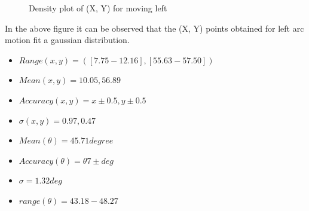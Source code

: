 \documentclass[11pt,a4paper,titlepage]{article}
\begin{document}
\begin{itemize}
\begin{figure}[H]
		\label{fig:sub1}
	\caption{\color{blue}Density plot of (X, Y) for moving left}
  \end{figure}
  In the above figure it can be observed that the (X, Y) points obtained for left arc motion fit a gaussian distribution.
\begin{itemize}
\item $ Range (x,y) =([7.75-12.16],[55.63-57.50])  $
\item $ Mean (x, y) = 10.05,56.89$
\item $ Accuracy (x,y) = x \pm0.5 , y \pm0.5  $ 
\item $ \sigma (x, y)= 0.97, 0.47 $
\item $ Mean(\theta) = 45.71 degree$
\item $ Accuracy (\theta)= \theta 7\pm  deg $
\item $ \sigma = 1.32 deg$
\item $ range (\theta) = 43.18 - 48.27 $
\end{itemize}
\end{itemize}



\end{document}
